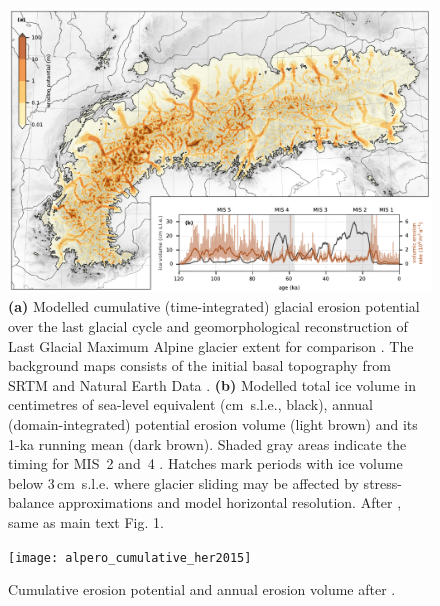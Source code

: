 \documentclass[esurf]{copernicus}
\begin{document}
    \begin{figure}
      \includegraphics{alpero_cumulative}
      \caption[%
        Cumulative erosion potential and annual erosion volume after
        \citet{Koppes.etal.2015}, same as main text Fig. 1.
        ]{%
        \textbf{(a)} Modelled cumulative (time-integrated) glacial erosion
          potential over the last glacial cycle and geomorphological
          reconstruction of Last Glacial Maximum Alpine glacier extent for
          comparison \citep[solid blue line,][]{Ehlers.etal.2011}.
          The background maps consists of the initial basal topography from
          SRTM \citep{Jarvis.etal.2008} and Natural Earth Data
          \citep{Patterson.Kelso.2017}.
        \textbf{(b)} Modelled total ice volume in centimetres of sea-level
          equivalent (cm~s.l.e., black), annual (domain-integrated) potential
          erosion volume (light brown) and its 1-ka running mean (dark brown).
          Shaded gray areas indicate the timing for MIS~2 and~4
          \citep{Lisiecki.Raymo.2005}. Hatches mark periods with ice volume
          below 3\,cm~s.l.e. where glacier sliding may be affected by
          stress-balance approximations and model horizontal resolution.
        After \citet{Koppes.etal.2015}, same as main text Fig. 1.}
      \label{fig:cumulative}
    \end{figure}

    \begin{figure}
      \texttt{[image: alpero\_cumulative\_her2015]}
      \caption{%
        Cumulative erosion potential and annual erosion volume after
        \citet{Herman.etal.2015}.}
    \end{figure}
\end{document}
